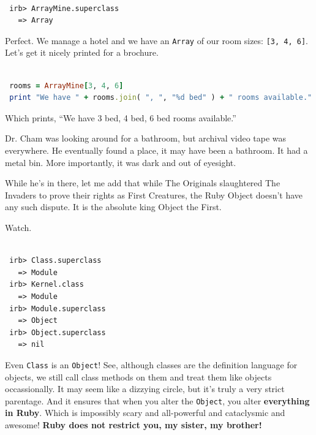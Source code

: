 \documentclass[10pt,twoside]{report}
\begin{document}
\begin{lstlisting}

 irb> ArrayMine.superclass
   => Array

\end{lstlisting}


Perfect.  We manage a hotel and we have an
\lstinline[breaklines=true]|Array| of our room sizes:
\lstinline[breaklines=true]|[3, 4, 6]|. Let's get it nicely printed
for a brochure.


\begin{lstlisting}[basicstyle=\ttfamily\color{basiccolor},
    commentstyle = \ttfamily\color{commentcolor},
    keywordstyle=\ttfamily\color{keywordscolor},
    stringstyle=\color{stringcolor},
    language=Ruby,
    basicstyle=\small\ttfamily,
    showstringspaces=false,
  ]

 rooms = ArrayMine[3, 4, 6]
 print "We have " + rooms.join( ", ", "%d bed" ) + " rooms available."

\end{lstlisting}


Which prints, ``We have 3 bed, 4 bed, 6 bed rooms available.''

Dr. Cham was looking around for a bathroom, but archival video tape
was everywhere. He eventually found a place, it may have been a
bathroom.  It had a metal bin. More importantly, it was dark and out
of eyesight.

While he's in there, let me add that while The Originals slaughtered
The Invaders to prove their rights as First Creatures, the Ruby Object
doesn't have any such dispute.  It is the absolute king Object the
First.

Watch.


\begin{lstlisting}

 irb> Class.superclass
   => Module
 irb> Kernel.class
   => Module
 irb> Module.superclass
   => Object
 irb> Object.superclass
   => nil

\end{lstlisting}


Even \lstinline[breaklines=true]|Class| is an
\lstinline[breaklines=true]|Object|!  See, although classes are the
definition language for objects, we still call class methods on them
and treat them like objects occassionally.  It may seem like a
dizzying circle, but it's truly a very strict parentage.  And it
ensures that when you alter the \lstinline[breaklines=true]|Object|,
you alter {\bf everything in Ruby}.  Which is impossibly scary and
all-powerful and cataclysmic and awesome!  {\bf Ruby does not restrict
  you, my sister, my brother!}
\end{document}
